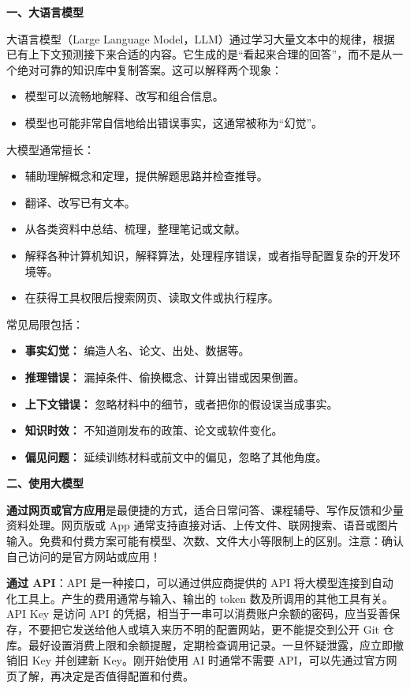 \textbf{一、大语言模型}

大语言模型（Large Language Model，LLM）通过学习大量文本中的规律，根据已有上下文预测接下来合适的内容。它生成的是“看起来合理的回答”，而不是从一个绝对可靠的知识库中复制答案。这可以解释两个现象：

\begin{itemize}
    \item 模型可以流畅地解释、改写和组合信息。
    \item 模型也可能非常自信地给出错误事实，这通常被称为“幻觉”。
\end{itemize}

大模型通常擅长：

\begin{itemize}
    \item 辅助理解概念和定理，提供解题思路并检查推导。
    \item 翻译、改写已有文本。
    \item 从各类资料中总结、梳理，整理笔记或文献。
    \item 解释各种计算机知识，解释算法，处理程序错误，或者指导配置复杂的开发环境等。
    \item 在获得工具权限后搜索网页、读取文件或执行程序。
\end{itemize}

常见局限包括：

\begin{itemize}
    \item \textbf{事实幻觉：} 编造人名、论文、出处、数据等。
    \item \textbf{推理错误：} 漏掉条件、偷换概念、计算出错或因果倒置。
    \item \textbf{上下文错误：} 忽略材料中的细节，或者把你的假设误当成事实。
    \item \textbf{知识时效：} 不知道刚发布的政策、论文或软件变化。
    \item \textbf{偏见问题：} 延续训练材料或前文中的偏见，忽略了其他角度。
\end{itemize}

\vspace{10pt}

\textbf{二、使用大模型}

\textbf{通过网页或官方应用}是最便捷的方式，适合日常问答、课程辅导、写作反馈和少量资料处理。网页版或 App 通常支持直接对话、上传文件、联网搜索、语音或图片输入。免费和付费方案可能有模型、次数、文件大小等限制上的区别。注意：确认自己访问的是官方网站或应用！

\textbf{通过 API}：API 是一种接口，可以通过供应商提供的 API 将大模型连接到自动化工具上。产生的费用通常与输入、输出的 token 数及所调用的其他工具有关。API Key 是访问 API 的凭据，相当于一串可以消费账户余额的密码，应当妥善保存，不要把它发送给他人或填入来历不明的配置网站，更不能提交到公开 Git 仓库。最好设置消费上限和余额提醒，定期检查调用记录。一旦怀疑泄露，应立即撤销旧 Key 并创建新 Key。刚开始使用 AI 时通常不需要 API，可以先通过官方网页了解，再决定是否值得配置和付费。

